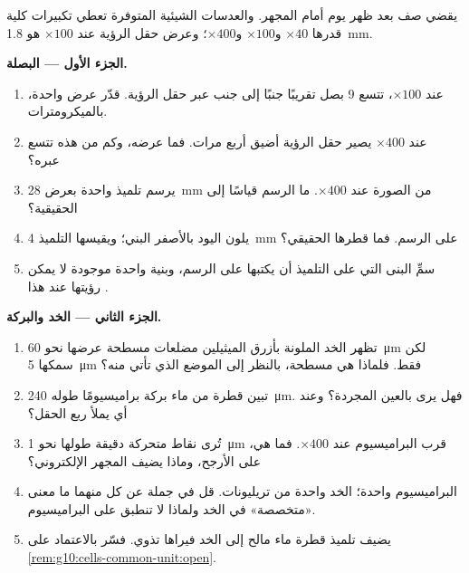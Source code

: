 \begin{problem}
\label{pb:g10:cells-common-unit:1}
يقضي صف بعد ظهر يوم أمام المجهر. والعدسات الشيئية المتوفرة تعطي
تكبيرات كلية قدرها $\times 40$ و$\times 100$ و$\times 400$؛ وعرض
حقل الرؤية عند $\times 100$ هو \qty{1.8}{mm}.

\medskip
\noindent\textbf{الجزء الأول --- البصلة.}
\begin{enumerate}
  \item عند $\times 100$، تتسع 9  بصل تقريبًا جنبًا إلى جنب عبر
        حقل الرؤية. قدّر عرض  واحدة، بالميكرومترات.
  \item عند $\times 400$ يصير حقل الرؤية أضيق أربع مرات. فما عرضه، وكم
         من هذه تتسع عبره؟
  \item يرسم تلميذ  واحدة بعرض \qty{28}{mm} من الصورة عند
        $\times 400$. ما  الرسم قياسًا إلى  الحقيقية؟
  \item يلون اليود  بالأصفر البني؛ ويقيسها التلميذ
        \qty{4}{mm} على الرسم. فما قطرها الحقيقي؟
  \item سمِّ البنى التي على التلميذ أن يكتبها على الرسم، وبنية واحدة
        موجودة لا يمكن رؤيتها عند هذا .
\end{enumerate}

\medskip
\noindent\textbf{الجزء الثاني --- الخد والبركة.}
\begin{enumerate}[resume]
  \item تظهر  الخد الملونة بأزرق الميثيلين مضلعات مسطحة عرضها نحو
        \qty{60}{\micro m} لكن سمكها \qty{5}{\micro m} فقط. فلماذا هي
        مسطحة، بالنظر إلى الموضع الذي تأتي منه؟
  \item تبين قطرة من ماء بركة براميسيومًا طوله \qty{240}{\micro m}.
        فهل يرى بالعين المجردة؟ وعند أي  يملأ ربع الحقل؟
  \item تُرى نقاط متحركة دقيقة طولها نحو \qty{1}{\micro m} قرب
        البراميسيوم عند $\times 400$. فما هي، على الأرجح، وماذا يضيف
        المجهر الإلكتروني؟
  \item البراميسيوم  واحدة؛  الخد واحدة من تريليونات. قل في
        جملة عن كل منهما ما معنى «متخصصة» في  الخد ولماذا لا
        تنطبق على البراميسيوم.
  \item يضيف تلميذ قطرة ماء مالح إلى  الخد فيراها تذوي. فسّر بالاعتماد على
        \cref{rem:g10:cells-common-unit:open}.
\end{enumerate}


\end{problem}
